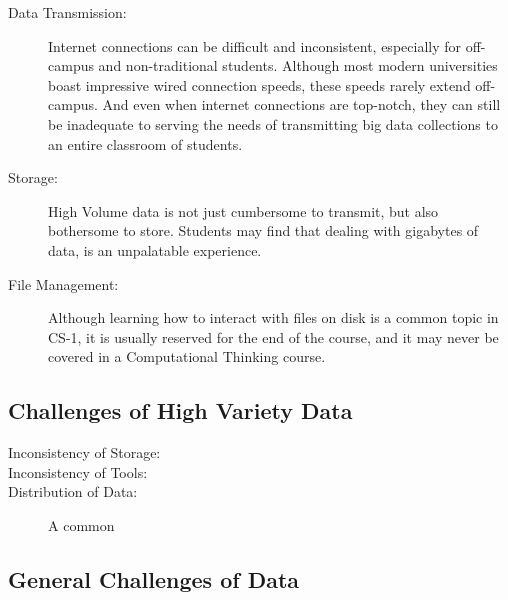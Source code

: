 \begin{description}
	\item[Data Transmission:] Internet connections can be difficult and inconsistent, especially for off-campus
and non-traditional students. Although most modern universities boast impressive wired connection
speeds, these speeds rarely extend off-campus. And even when internet connections are top-notch,
they can still be inadequate to serving the needs of transmitting big data collections to an entire
classroom of students.
  \item[Storage:] High Volume data is not just cumbersome to transmit, but also bothersome to store. Students may find that dealing with gigabytes of data, is an unpalatable experience.
	\item[File Management:] Although learning how to interact with files on disk is a common topic in CS-1, it is usually reserved for the end of the course, and it may never be covered in a Computational Thinking course. 
\end{description}


\subsection{Challenges of High Variety Data}

\begin{description}
\item[Inconsistency of Storage:]
\item[Inconsistency of Tools:]
\item[Distribution of Data:] A common 
\end{description}

\subsection{General Challenges of Data}

